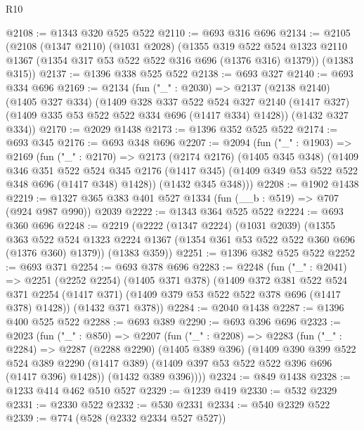 \begin{lexlean}{R10}
\begin{coremodule}
@2108 := @1343 @320 @525 @522
@2110 := @693 @316 @696
@2134 := @2105
    (@2108
      (@1347 @2110)
      (@1031 @2028)
      (@1355
        @319
        @522
        @524
        @1323
        @2110
        @1367
        (@1354 @317 @53 @522 @522 @316 @696 (@1376 @316) @1379))
      (@1383 @315))
@2137 := @1396 @338 @525 @522
@2138 := @693 @327
@2140 := @693 @334 @696
@2169 := @2134
    (fun ("_" : @2030) =>
    @2137
      (@2138 @2140)
      (@1405 @327 @334)
      (@1409
        @328
        @337
        @522
        @524
        @327
        @2140
        (@1417 @327)
        (@1409 @335 @53 @522 @522 @334 @696 (@1417 @334) @1428))
      (@1432 @327 @334))
@2170 := @2029 @1438
@2173 := @1396 @352 @525 @522
@2174 := @693 @345
@2176 := @693 @348 @696
@2207 := @2094
    (fun ("_" : @1903) =>
    @2169
      (fun ("_" : @2170) =>
      @2173
        (@2174 @2176)
        (@1405 @345 @348)
        (@1409
          @346
          @351
          @522
          @524
          @345
          @2176
          (@1417 @345)
          (@1409 @349 @53 @522 @522 @348 @696 (@1417 @348) @1428))
        (@1432 @345 @348)))
@2208 := @1902 @1438
@2219 := @1327 @365 @383 @401 @527 @1334 (fun (__b : @519) => @707 (@924 @987 @990)) @2039
@2222 := @1343 @364 @525 @522
@2224 := @693 @360 @696
@2248 := @2219
    (@2222
      (@1347 @2224)
      (@1031 @2039)
      (@1355
        @363
        @522
        @524
        @1323
        @2224
        @1367
        (@1354 @361 @53 @522 @522 @360 @696 (@1376 @360) @1379))
      (@1383 @359))
@2251 := @1396 @382 @525 @522
@2252 := @693 @371
@2254 := @693 @378 @696
@2283 := @2248
    (fun ("_" : @2041) =>
    @2251
      (@2252 @2254)
      (@1405 @371 @378)
      (@1409
        @372
        @381
        @522
        @524
        @371
        @2254
        (@1417 @371)
        (@1409 @379 @53 @522 @522 @378 @696 (@1417 @378) @1428))
      (@1432 @371 @378))
@2284 := @2040 @1438
@2287 := @1396 @400 @525 @522
@2288 := @693 @389
@2290 := @693 @396 @696
@2323 := @2023
    (fun ("_" : @850) =>
    @2207
      (fun ("_" : @2208) =>
      @2283
        (fun ("_" : @2284) =>
        @2287
          (@2288 @2290)
          (@1405 @389 @396)
          (@1409
            @390
            @399
            @522
            @524
            @389
            @2290
            (@1417 @389)
            (@1409 @397 @53 @522 @522 @396 @696 (@1417 @396) @1428))
          (@1432 @389 @396))))
@2324 := @849 @1438
@2328 := @1233 @414 @462 @510 @527
@2329 := @1239 @419
@2330 := @532 @2329
@2331 := @2330 @522
@2332 := @530 @2331
@2334 := @540 @2329 @522
@2339 := @774 (@528 (@2332 @2334 @527 @527))

\end{coremodule}
\end{lexlean}
